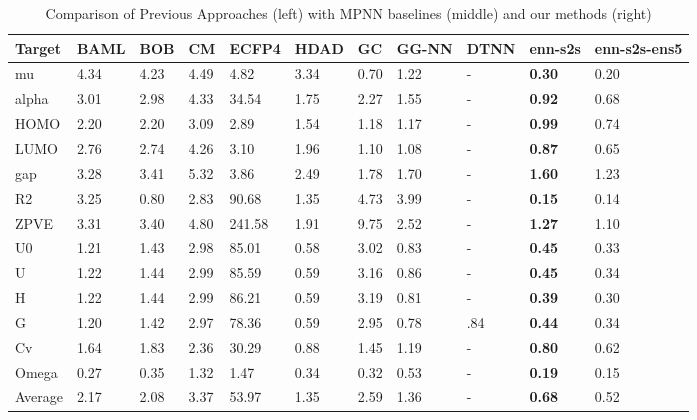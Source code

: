 \documentclass{article}
\begin{document}
\begin{table}[t]
\centering
\caption{Comparison of Previous Approaches (left) with MPNN baselines (middle) and our methods (right)}
\abovespace\belowspace
\label{tb:main}
\begin{tabular}{llllll|lll|ll}
\hline
Target & BAML & BOB  & CM   & ECFP4  & HDAD & GC & GG-NN & DTNN & enn-s2s & enn-s2s-ens5 \\
\hline
\abovespace
mu     & 4.34 & 4.23 & 4.49 & 4.82   & 3.34   & 0.70 & 1.22  & - & \textbf{0.30}    & 0.20            \\
alpha  & 3.01 & 2.98 & 4.33 & 34.54  & 1.75   & 2.27 & 1.55  & - & \textbf{0.92}    & 0.68            \\
HOMO   & 2.20 & 2.20 & 3.09 & 2.89   & 1.54   & 1.18 & 1.17  & - & \textbf{0.99}    & 0.74            \\
LUMO   & 2.76 & 2.74 & 4.26 & 3.10   & 1.96   & 1.10 & 1.08  & - & \textbf{0.87}    & 0.65            \\
gap    & 3.28 & 3.41 & 5.32 & 3.86   & 2.49   & 1.78 & 1.70  & - & \textbf{1.60}    & 1.23            \\
R2     & 3.25 & 0.80 & 2.83 & 90.68  & 1.35   & 4.73 & 3.99  & - & \textbf{0.15}    & 0.14            \\
ZPVE   & 3.31 & 3.40 & 4.80 & 241.58 & 1.91   & 9.75 & 2.52  & - & \textbf{1.27}    & 1.10            \\
U0     & 1.21 & 1.43 & 2.98 & 85.01  & 0.58   & 3.02 & 0.83  & - & \textbf{0.45}    & 0.33            \\
U      & 1.22 & 1.44 & 2.99 & 85.59  & 0.59   & 3.16 & 0.86  & - & \textbf{0.45}    & 0.34            \\
H      & 1.22 & 1.44 & 2.99 & 86.21  & 0.59   & 3.19 & 0.81  & - & \textbf{0.39}    & 0.30            \\
G      & 1.20 & 1.42 & 2.97 & 78.36  & 0.59   & 2.95 & 0.78  & .84\footnotemark & \textbf{0.44}    & 0.34            \\
Cv     & 1.64 & 1.83 & 2.36 & 30.29  & 0.88   & 1.45 & 1.19  & - & \textbf{0.80}    & 0.62            \\
Omega  & 0.27 & 0.35 & 1.32 & 1.47   & 0.34   & 0.32 & 0.53  & - & \textbf{0.19}    & 0.15            \\
\hline
Average &	2.17 &	2.08 &	3.37 &	53.97 &	1.35 &		2.59 &	1.36 & - &	\textbf{0.68} &	0.52  \\
\end{tabular}
\end{table}
\end{document}
